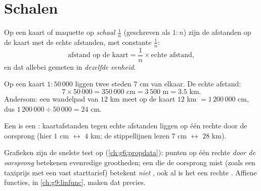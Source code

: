\section{Schalen}

\begin{definition}[Schaal]\label{def:g7:prop:scale}
Op een kaart of maquette op \emph{schaal} $\frac{1}{n}$ (geschreven
als $1 : n$) zijn de afstanden op de kaart  met de echte afstanden, met
constante $\frac1n$:
\[
\text{afstand op de kaart} = \frac{1}{n} \times \text{echte afstand},
\]
en dat allebei gemeten in \emph{dezelfde eenheid}.
\end{definition}

\begin{example}\label{ex:g7:prop:scale}
Op een kaart $1 : 50\,000$ liggen twee steden $7$ cm van elkaar. De echte afstand:
\[
7 \times 50\,000 = 350\,000 \text{ cm} = 3\,500 \text{ m} = 3.5
\text{ km}.
\]
Andersom: een wandelpad van $12$ km meet op de kaart
$12$ km $= 1\,200\,000$ cm, dus $1\,200\,000 \div 50\,000 = 24$ cm.
\end{example}

\begin{omfigure}

{\small Een  is een : kaartafstanden tegen echte afstanden
liggen op één rechte  door de oorsprong (hier $1$ cm $\leftrightarrow$ $4$ km;
de stippellijnen lezen $7$ cm $\leftrightarrow$ $28$ km).}
\end{omfigure}

\begin{remark}
Grafieken zijn de snelste test op  (\cref{ch:g6:propdata}): punten op
één rechte  \emph{door de oorsprong} betekenen evenredige grootheden; een 
die de oorsprong mist (zoals een taxiprijs met een vast starttarief) betekent
\emph{niet} , ook al is het een rechte . Affiene functies, in
\cref{ch:g9:linfunc}, maken dat precies.
\end{remark}

